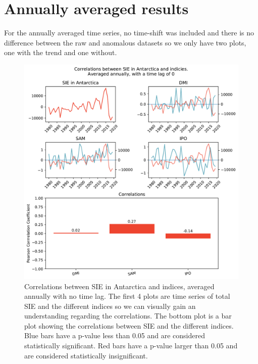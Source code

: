 \section{Annually averaged results}
For the annually averaged time series, no time-shift was included and there is no difference between the raw and anomalous datasets so we only have two plots, one with the trend and one without.
\begin{figure}[H]
    \centering
    \includegraphics[width=\linewidth]{Images_3.0/correlations/subplots_indicies_annually_0_anomalous.pdf}
    \caption[Correlations between SIE in Antarctica and indices, averaged annually with no time lag.]{Correlations between SIE in Antarctica and indices, averaged annually with no time lag. The first 4 plots are time series of total SIE and the different indices so we can visually gain an understanding regarding the correlations. The bottom plot is a bar plot showing the correlations between SIE and the different indices. Blue bars have a p-value less than 0.05 and are considered statistically significant. Red bars have a p-value larger than 0.05 and are considered statistically insignificant.}
    \label{fig:anual_with_trend}
\end{figure}

